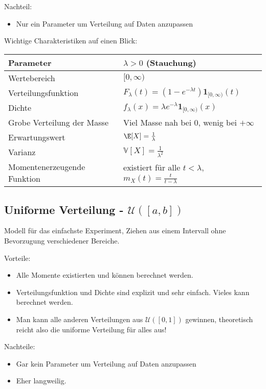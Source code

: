 {Nachteil:}
\begin{itemize}
	\item Nur ein Parameter um Verteilung auf Daten anzupassen
\end{itemize}

Wichtige Charakteristiken auf einen Blick:
\begin{center}
\begin{tabular}[h]{|l|l|}
\hline
Parameter& $\lambda>0$ (Stauchung)\\
\hline
Wertebereich & $[0,\infty)$\\
\hline
Verteilungsfunktion & $F_\lambda(t)= (1-e^{-\lambda t})\mathbf 1_{[0,\infty)}(t) $\\
\hline
Dichte & $f_\lambda(x)=\lambda e^{-\lambda} \mathbf 1_{[0,\infty)}(x)$\\
\hline
Grobe Verteilung der Masse & Viel Masse nah bei $0$, wenig bei $+\infty$\\
\hline
Erwartungswert& $\E[X]=\frac{1}{\lambda}$ \\
\hline
Varianz & $\mathbb V[X]=\frac{1}{\lambda^2} $\\
\hline
Momentenerzeugende Funktion& existiert f\"ur alle $t<\lambda$, $m_X(t)=\frac{t}{t-\lambda}$\\
\hline
\end{tabular}
\end{center}


\subsection{Uniforme Verteilung - $\mathcal U([a,b])$}

Modell f\"ur das einfachste Experiment, Ziehen aus einem Intervall ohne Bevorzugung verschiedener Bereiche.\smallskip

{Vorteile:} 
\begin{itemize}
\item Alle Momente existierten und k\"onnen berechnet werden.
\item Verteilungsfunktion und Dichte sind explizit und sehr einfach. Vieles kann berechnet werden.
\item Man kann alle anderen Verteilungen aus $\mathcal U([0,1])$ gewinnen, theoretisch reicht also die uniforme Verteilung f\"ur alles aus!
\end{itemize}

{Nachteile:}
\begin{itemize}
	\item Gar kein Parameter um Verteilung auf Daten anzupassen
	\item Eher langweilig.
\end{itemize}

